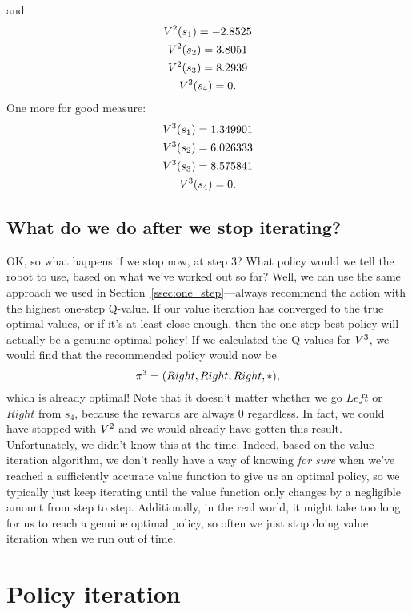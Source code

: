 \documentclass[a4paper]{article}
\begin{document}
and
\begin{gather*}
  V^2(s_1) = -2.8525 \\
  V^2(s_2) = 3.8051 \\
  V^2(s_3) = 8.2939 \\
  V^2(s_4) = 0 .
\end{gather*}
One more for good measure:
\begin{gather*}
  V^3(s_1) = 1.349901 \\
  V^3(s_2) = 6.026333 \\
  V^3(s_3) = 8.575841 \\
  V^3(s_4) = 0 .
\end{gather*}

\subsection{What do we do after we stop iterating?}
OK, so what happens if we stop now, at step 3? What policy would we tell the
robot to use, based on what we've worked out so far?
Well, we can use the same approach we used in
Section~\ref{ssec:one_step}---always recommend the action with the highest
one-step Q-value.
If our value iteration has converged to the true optimal values, or if it's
at least close enough, then the one-step best policy will actually be
a genuine optimal policy!
If we calculated the Q-values for $V^3$, we would find that the recommended
policy would now be
\begin{equation*}
  \pi^3 = (Right, Right, Right, *) ,
\end{equation*}
which is already optimal!
Note that it doesn't matter whether we go $Left$ or $Right$ from $s_4$,
because the rewards are always 0 regardless.
In fact, we could have stopped with $V^2$ and we would already have
gotten this result.
Unfortunately, we didn't know this at the time.
Indeed, based on the value iteration algorithm, we don't really have a way
of knowing \emph{for sure} when we've reached a sufficiently accurate
value function to give us an optimal policy,
so we typically just keep iterating until the value function only changes
by a negligible amount from step to step.
Additionally, in the real world, it might take too long for us to reach
a genuine optimal policy, so often we just stop doing value iteration
when we run out of time.

\section{Policy iteration}
\end{document}
